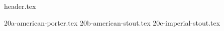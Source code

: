 \clearpage
{}
\divisorLine
{header.tex}
\begin{multicols}{2}
{20a-american-porter.tex}
{20b-american-stout.tex}
{20c-imperial-stout.tex}
\end{multicols}